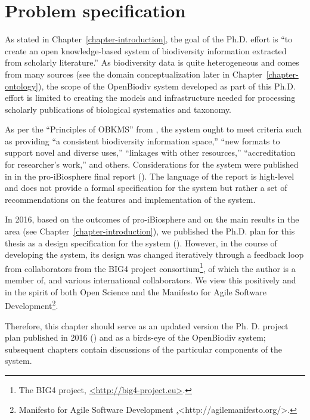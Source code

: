 \chapter{Problem specification}
\label{chapter-problem-defintion}

As stated in Chapter~\ref{chapter-introduction}, the goal of the Ph.D. effort is ``to create an open knowledge-based system of biodiversity information extracted from scholarly literature.''  As biodiversity data is quite heterogeneous and comes from many sources (see the domain conceptualization later in Chapter~\ref{chapter-ontology}), the scope of the OpenBiodiv system developed as part of this Ph.D. effort is limited to creating the models and infrastructure needed for processing scholarly publications of biological systematics and taxonomy. 

As per the ``Principles of OBKMS'' from \cite{pro-ibiosphere_open_2014}, the system ought to meet criteria such as providing ``a consistent biodiversity information space,'' ``new formats to support novel and diverse uses,'' ``linkages with other resources,'' ``accreditation for researcher's work,'' and others. Considerations for the system were published in in the pro-iBiosphere final report (\cite{soraya_sierra_coordination_2014}). The language of the report is high-level and does not provide a formal specification for the system but rather a set of recommendations on the features and implementation of the system.

In 2016, based on the outcomes of pro-iBiosphere and on the main results in the area (see Chapter~\ref{chapter-introduction}), we published the Ph.D. plan for this thesis as a design specification for the system (\cite{senderov_open_2016}). However, in the course of developing the system, its design was changed iteratively through a feedback loop from collaborators from the BIG4 project consortium\footnote{The BIG4 project, \href{http://big4-project.eu}{<http://big4-project.eu>}.}, of which the author is a member of, and various international collaborators. We view this positively and in the spirit of both Open Science and the Manifesto for Agile Software Development\footnote{Manifesto for Agile Software Development \href{http://agilemanifesto.org/},{<http://agilemanifesto.org/>}.}.

Therefore, this chapter should serve as an updated version the Ph. D. project plan published in 2016 (\cite{senderov_open_2016}) and as a birds-eye of the OpenBiodiv system; subsequent chapters contain discussions of the particular components of the system.

